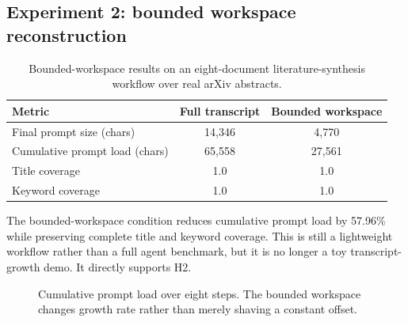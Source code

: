 \documentclass[11pt]{article}
\begin{document}
\subsection{Experiment 2: bounded workspace reconstruction}
\begin{table}[t]
    \centering
    \caption{Bounded-workspace results on an eight-document literature-synthesis workflow over real arXiv abstracts.}
    \begin{tabular}{lcc}
        \toprule
        Metric & Full transcript & Bounded workspace \\
        \midrule
        Final prompt size (chars) & 14,346 & 4,770 \\
        Cumulative prompt load (chars) & 65,558 & 27,561 \\
        Title coverage & 1.0 & 1.0 \\
        Keyword coverage & 1.0 & 1.0 \\
        \bottomrule
    \end{tabular}
    \label{tab:workspace}
\end{table}

The bounded-workspace condition reduces cumulative prompt load by 57.96\% while preserving complete title and keyword coverage. This is still a lightweight workflow rather than a full agent benchmark, but it is no longer a toy transcript-growth demo. It directly supports H2.

\begin{figure}[t]
\centering
{}
\caption{Cumulative prompt load over eight steps. The bounded workspace changes growth rate rather than merely shaving a constant offset.}
\label{fig:workspace-line}
\end{figure}
\end{document}
